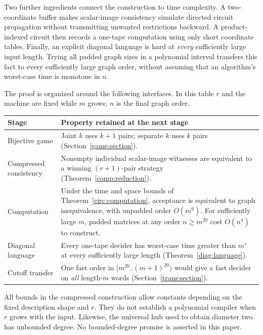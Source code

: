 \documentclass[11pt]{article}
\theoremstyle{definition}
\theoremstyle{remark}
\numberwithin{equation}{section}
\begin{document}
Two further ingredients connect the construction to time complexity.
A two-coordinate buffer makes scalar-image consistency simulate
directed circuit propagation without transmitting unwanted
restrictions backward. A product-indexed circuit then records a
one-tape computation using only short coordinate tables. Finally,
an explicit diagonal language is hard at \emph{every} sufficiently
large input length. Trying all padded graph sizes in a polynomial
interval transfers this fact to every sufficiently large graph
order, without assuming that an algorithm's worst-case time is
monotone in $n$.

The proof is organized around the following interfaces. In this table
$r$ and the machine are fixed while $m$ grows; $n$ is the final graph order.
\begin{center}
\small
\begin{tabular}{@{}p{}p{}@{}}
\toprule
Stage & Property retained at the next stage \\
\midrule
Bijective game & Joint $k$ uses $k+1$ pairs; separate $k$ uses $k$ pairs
  (Section~\ref{game:section}). \\
Compressed consistency & Nonempty individual scalar-image witnesses
  are equivalent to a winning $(r+1)$-pair strategy
  (Theorem~\ref{comp:reduction}). \\
Computation & Under the time and space bounds of
  Theorem~\ref{circ:computation}, acceptance is equivalent to graph
  inequivalence, with unpadded order $O(m^6)$. For sufficiently large
  $m$, padded matrices at any order $n\ge m^{20}$ cost $O(n^4)$
  to construct. \\
Diagonal language & Every one-tape decider has worst-case time greater
  than $m^s$ at every sufficiently large length
  (Theorem~\ref{diag:language}). \\
Cutoff transfer & One fast order in $[m^{20},(m+1)^{20})$ would give
  a fast decider on \emph{all} length-$m$ words
  (Section~\ref{trans:section}). \\
\bottomrule
\end{tabular}
\end{center}

All bounds in the compressed construction allow constants depending on
the fixed description shape and $r$. They do not establish a polynomial
compiler when $r$ grows with the input. Likewise, the universal hub used
to obtain diameter two has unbounded degree. No bounded-degree promise
is asserted in this paper.
\end{document}

